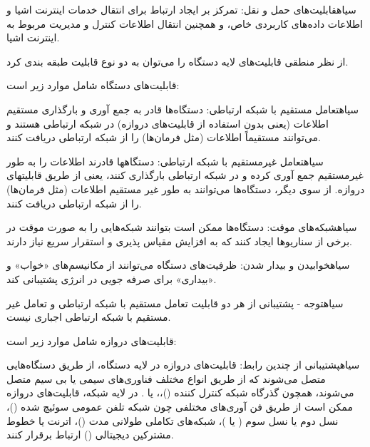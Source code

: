  ‌سیاه{قابلیت‌های حمل و نقل}:
تمرکز بر ایجاد ارتباط برای انتقال خدمات اینترنت اشیا و اطلاعات داده‌های کاربردی خاص، و همچنین انتقال اطلاعات کنترل و مدیریت مربوط به اینترنت اشیا.



از نظر منطقی قابلیت‌های لایه دستگاه را می‌توان به دو نوع قابلیت طبقه بندی کرد.


 قابلیت‌های دستگاه شامل موارد زیر است:
 

 ‌سیاه{تعامل مستقیم با شبکه ارتباطی}:
دستگاه‌ها قادر به جمع آوری و بارگذاری مستقیم اطلاعات (یعنی بدون استفاده از قابلیت‌های دروازه) در شبکه ارتباطی هستند و می‌توانند مستقیماً اطلاعات (مثل فرمان‌ها) را از شبکه ارتباطی دریافت کنند.

 ‌سیاه{تعامل غیرمستقیم با شبکه ارتباطی}:
دستگاهها قادرند اطلاعات را به طور غیرمستقیم جمع آوری کرده و در شبکه ارتباطی بارگذاری کنند، یعنی از طریق قابلیتهای دروازه. از سوی دیگر، دستگاه‌ها می‌توانند به طور غیر مستقیم اطلاعات (مثل فرمان‌ها) را از شبکه ارتباطی دریافت کنند.

 ‌سیاه{شبکه‌های موقت}:
دستگاه‌ها ممکن است بتوانند شبکه‌هایی را به صورت موقت در برخی از سناریوها ایجاد کنند که به افزایش مقیاس پذیری و استقرار سریع نیاز دارند.

 ‌سیاه{خوابیدن و بیدار شدن}:
ظرفیت‌های دستگاه می‌توانند از مکانیسم‌های «خواب» و «بیداری» برای صرفه جویی در انرژی پشتیبانی کند.

‌سیاه{توجه}
- پشتیبانی از هر دو قابلیت تعامل مستقیم با شبکه ارتباطی و تعامل غیر مستقیم با شبکه ارتباطی اجباری نیست.



قابلیت‌های دروازه شامل موارد زیر است:


 ‌سیاه{پشتیبانی از چندین رابط}:
قابلیت‌های دروازه در لایه دستگاه، از طریق دستگاه‌هایی متصل می‌شوند که از طریق انواع مختلف فناوری‌های سیمی یا بی سیم متصل می‌شوند، همچون گذرگاه شبکه کنترل کننده ()،، یا . در لایه شبکه، قابلیت‌های دروازه ممکن است از طریق فن آوری‌های مختلفی چون شبکه تلفن عمومی سوئیچ شده ()، نسل دوم یا نسل سوم ( یا )، شبکه‌های تکاملی طولانی مدت ()، اترنت یا خطوط مشترکین دیجیتالی () ارتباط برقرار کنند.

